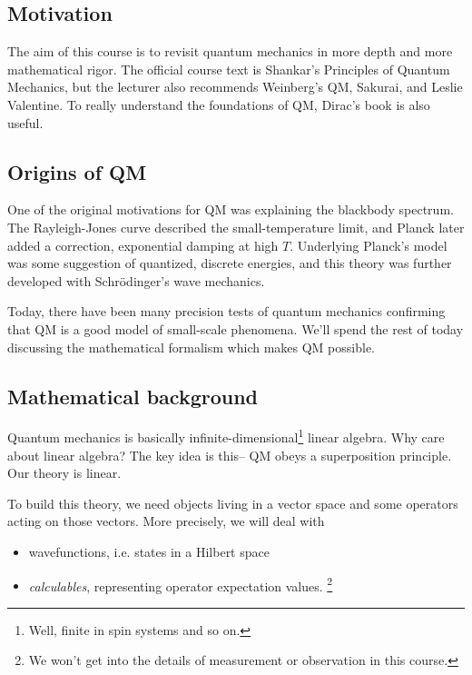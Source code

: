 \subsection*{Motivation}
The aim of this course is to revisit quantum mechanics in more depth and more mathematical rigor. The official course text is Shankar's Principles of Quantum Mechanics, but the lecturer also recommends Weinberg's QM, Sakurai, and Leslie Valentine. To really understand the foundations of QM, Dirac's book is also useful.

\subsection*{Origins of QM}
One of the original motivations for QM was explaining the blackbody spectrum. The Rayleigh-Jones curve described the small-temperature limit, and Planck later added a correction, exponential damping at high $T$. Underlying Planck's model was some suggestion of quantized, discrete energies, and this theory was further developed with Schr\"odinger's wave mechanics.

Today, there have been many precision tests of quantum mechanics confirming that QM is a good model of small-scale phenomena. We'll spend the rest of today discussing the mathematical formalism which makes QM possible.

\subsection*{Mathematical background}
Quantum mechanics is basically infinite-dimensional\footnote{Well, finite in spin systems and so on.} linear algebra. Why care about linear algebra? The key idea is this-- QM obeys a superposition principle. Our theory is linear.

To build this theory, we need objects living in a vector space and some operators acting on those vectors. More precisely, we will deal with 
\begin{itemize}
    \item wavefunctions, i.e. states in a Hilbert space
    \item \emph{calculables}, representing operator expectation values.%
        \footnote{We won't get into the details of measurement or observation in this course.}
\end{itemize}

